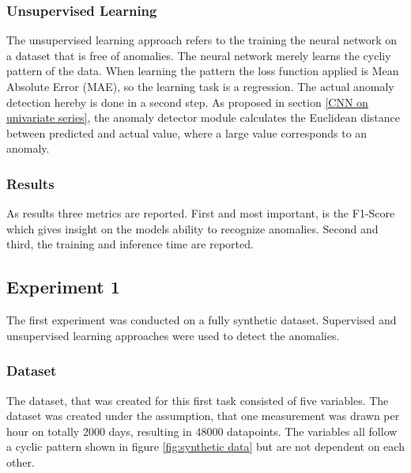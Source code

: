 \subsubsection{Unsupervised Learning}
The unsupervised learning approach refers to the training the neural network on a dataset that is free of anomalies. The neural network merely learns the cycliy pattern of the data. When learning the pattern the loss function applied is Mean Absolute Error (MAE), so the learning task is a regression. The actual anomaly detection hereby is done in a second step. As proposed in section \ref{CNN on univariate series}, the anomaly detector module calculates the Euclidean distance between predicted and actual value, where a large value corresponds to an anomaly.

\subsubsection{Results}
As results three metrics are reported. First and most important, is the F1-Score which gives insight on the models ability to recognize anomalies. Second and third, the training and inference time are reported.
   

\subsection{Experiment 1}
The first experiment was conducted on a fully synthetic dataset. Supervised and unsupervised learning approaches were used to detect the anomalies. 

\subsubsection{Dataset}
The dataset, that was created for this first task consisted of five variables. The dataset was created under the assumption, that one measurement was drawn per hour on totally 2000 days, resulting in 48000 datapoints. The variables all follow a cyclic pattern shown in figure \ref{fig:synthetic data} but are not dependent on each other. 

